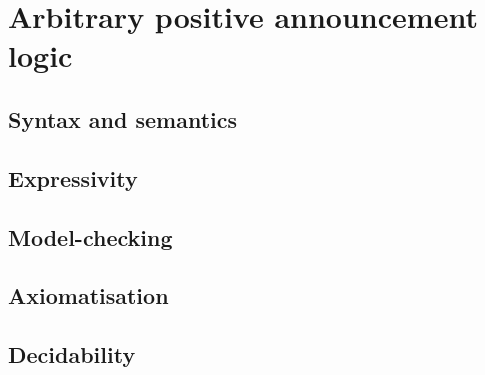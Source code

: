 \chapter{Arbitrary positive announcement logic}\label{papal}

\section{Syntax and semantics}

\section{Expressivity}

\section{Model-checking}

\section{Axiomatisation}

\section{Decidability}
